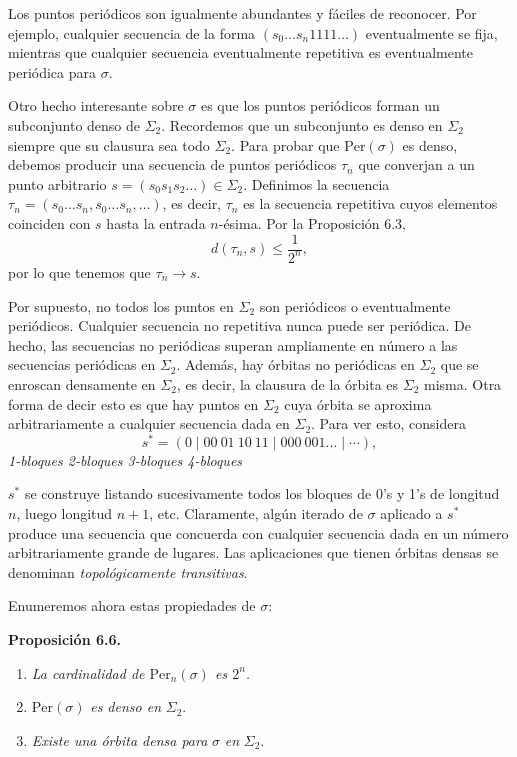 \documentclass[10pt,a4paper]{book}
\begin{document}
Los puntos periódicos son igualmente abundantes y fáciles de reconocer. Por ejemplo, cualquier secuencia de la forma \( (s_0 \ldots s_n 1111 \ldots) \) eventualmente se fija, mientras que cualquier secuencia eventualmente repetitiva es eventualmente periódica para \( \sigma \).

Otro hecho interesante sobre \( \sigma \) es que los puntos periódicos forman un subconjunto denso de \( \Sigma_2 \). Recordemos que un subconjunto es denso en \( \Sigma_2 \) siempre que su clausura sea todo \( \Sigma_2 \). Para probar que \( \text{Per}(\sigma) \) es denso, debemos producir una secuencia de puntos periódicos \( \tau_n \) que converjan a un punto arbitrario \( s = (s_0 s_1 s_2 \ldots) \in \Sigma_2 \). Definimos la secuencia \( \tau_n = (s_0 \ldots s_n, s_0 \ldots s_n, \ldots) \), es decir, \( \tau_n \) es la secuencia repetitiva cuyos elementos coinciden con \( s \) hasta la entrada \( n \)-ésima. Por la Proposición 6.3,
\[
d(\tau_n, s) \leq \frac{1}{2^n},
\]
por lo que tenemos que \( \tau_n \to s \).

Por supuesto, no todos los puntos en \( \Sigma_2 \) son periódicos o eventualmente periódicos. Cualquier secuencia no repetitiva nunca puede ser periódica. De hecho, las secuencias no periódicas superan ampliamente en número a las secuencias periódicas en \( \Sigma_2 \). Además, hay órbitas no periódicas en \( \Sigma_2 \) que se enroscan densamente en \( \Sigma_2 \), es decir, la clausura de la órbita es \( \Sigma_2 \) misma. Otra forma de decir esto es que hay puntos en \( \Sigma_2 \) cuya órbita se aproxima arbitrariamente a cualquier secuencia dada en \( \Sigma_2 \). Para ver esto, considera
\[
s^* = (0 \mid 00\ 01\ 10\ 11 \mid 000\ 001 \ldots \mid \cdots),
\]
\textit{1-bloques \hspace{2em} 2-bloques \hspace{2em} 3-bloques \hspace{2em} 4-bloques}

\( s^* \) se construye listando sucesivamente todos los bloques de 0's y 1's de longitud \( n \), luego longitud \( n + 1 \), etc. Claramente, algún iterado de \( \sigma \) aplicado a \( s^* \) produce una secuencia que concuerda con cualquier secuencia dada en un número arbitrariamente grande de lugares. Las aplicaciones que tienen órbitas densas se denominan \textit{topológicamente transitivas}.

Enumeremos ahora estas propiedades de \( \sigma \):

\textbf{Proposición 6.6.}
\begin{enumerate}
    \item \textit{La cardinalidad de $\text{Per}_n(\sigma)$ es $2^n$.}
    \item $\text{Per}(\sigma)$ \textit{es denso en } $\Sigma_2$.
    \item \textit{Existe una órbita densa para } $\sigma$ \textit{ en } $\Sigma_2$.
\end{enumerate}
\end{document}
